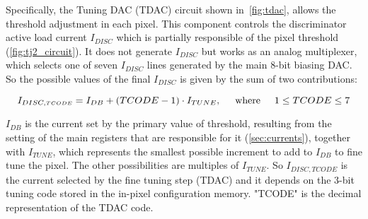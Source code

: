 %
Specifically, the Tuning DAC (TDAC) circuit shown in~\autoref{fig:tdac}, allows the threshold adjustment in each pixel. This component controls the discriminator active load current $I_{DISC}$ which is partially responsible of the pixel threshold (\autoref{fig:tj2_circuit}). It does not generate $I_{DISC}$ but works as an analog multiplexer, which selects one of seven $I_{DISC}$ lines generated by the main 8-bit biasing DAC. So the possible values of the final $I_{DISC}$ is given by the sum of two contributions:

\begin{equation}
I_{DISC, \scriptscriptstyle TCODE}  = I_{DB} + (TCODE - 1) \cdot I_{TUNE},  \hspace{.5cm}	\mbox{where} \hspace{.5cm} 1 \leq TCODE \leq 7 
\label{eq:tuning_eq}
\end{equation}


\textbf{$I_{DB}$} is the current set by the primary value of threshold, resulting from the setting of the main registers that are responsible for it (\autoref{sec:currents}), together with \textbf{$I_{TUNE}$}, which represents the smallest possible increment to add to \textbf{$I_{DB}$} to fine tune the pixel. The other possibilities are multiples of \textbf{$I_{TUNE}$}. 
So \textbf{$I_{DISC, \scriptscriptstyle TCODE}$} is the current selected by the fine tuning step (TDAC) and it depends on the 3-bit tuning code stored in the in-pixel configuration memory.
"TCODE" is the decimal representation of the TDAC code. 

\begin{comment}
For example if the 3-bit DAC are set to "111", the decimal representation is 7 and the fine tuning provide a current $I_{DISC,7}$, which corresponds to the highest threshold. If the 3-bit are set to "001" the corresponding TCODE is 1 and the current $I_{DISC,1}$ is provided, which set the lowest possible threshold around the central value $I_{DB}$. The particular combination "000" instead (TCODE~=~0) masks the single pixel by disabling the discriminator, without affecting the operation of the others.
\end{comment}


